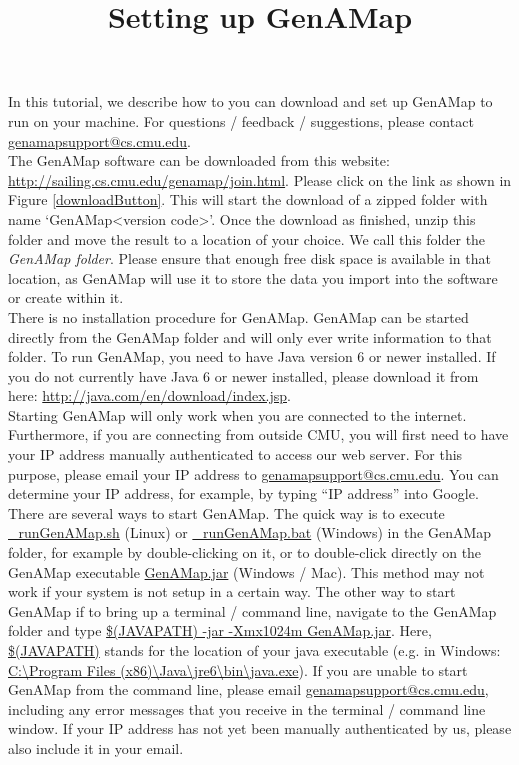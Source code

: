\documentclass{article}
\title{Setting up GenAMap}
\author{}
\date{}
\begin{document}
\maketitle


In this tutorial, we describe how to you can download and set up GenAMap to run on your machine. For questions / feedback / suggestions, please contact \url{genamapsupport@cs.cmu.edu}.\\

The GenAMap software can be downloaded from this website: \url{http://sailing.cs.cmu.edu/genamap/join.html}. Please click on the link as shown in Figure \ref{downloadButton}. This will start the download of a zipped folder with name `GenAMap\textless version code\textgreater'. Once the download as finished, unzip this folder and move the result to a location of your choice. We call this folder the {\it GenAMap folder}. Please ensure that enough free disk space is available in that location, as GenAMap will use it to store the data you import into the software or create within it.\\

There is no installation procedure for GenAMap. GenAMap can be started directly from the GenAMap folder and will only ever write information to that folder. To run GenAMap, you need to have Java version 6 or newer installed. If you do not currently have Java 6 or newer installed, please download it from here: \url{http://java.com/en/download/index.jsp}.\\

Starting GenAMap will only work when you are connected to the internet. Furthermore, if you are connecting from outside CMU, you will first need to have your IP address manually authenticated to access our web server. For this purpose, please email your IP address to \url{genamapsupport@cs.cmu.edu}. You can determine your IP address, for example, by typing ``IP address'' into Google.\\

There are several ways to start GenAMap. The quick way is to execute \url{_runGenAMap.sh} (Linux) or \url{_runGenAMap.bat} (Windows) in the GenAMap folder, for example by double-clicking on it, or to double-click directly on the GenAMap executable \url{GenAMap.jar} (Windows / Mac). This method may not work if your system is not setup in a certain way. The other way to start GenAMap if to bring up a terminal / command line, navigate to the GenAMap folder and type \url{$(JAVAPATH) -jar -Xmx1024m GenAMap.jar}. Here, \url{$(JAVAPATH)} stands for the location of your java executable (e.g. in Windows: \url{C:\Program Files (x86)\Java\jre6\bin\java.exe}). If you are unable to start GenAMap from the command line, please email \url{genamapsupport@cs.cmu.edu}, including any error messages that you receive in the terminal / command line window. If your IP address has not yet been manually authenticated by us, please also include it in your email.\\
\end{document}
